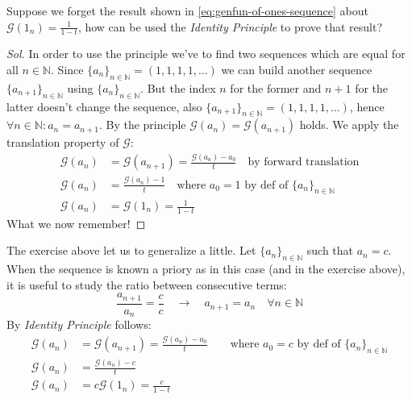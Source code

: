 \begin{exercise}
  Suppose we forget the result shown in
  \autoref{eq:genfun-of-ones-sequence} about $\mathcal{G} (1_n) =
  \frac{1}{1-t} $, how can be used the \emph{Identity Principle} to
  prove that result?
\end{exercise}
\begin{proof}[Sol]
  In order to use the principle we've to find two sequences which are
  equal for all $n \in \mathbb{N} $. Since $\{a_n\}_{n\in\mathbb{N} }
  = (1,1,1,1,\ldots)$ we can build another sequence
  $\{a_{n+1}\}_{n\in\mathbb{N} } $ using $\{a_n\}_{n\in\mathbb{N} }
  $. But the index $n$ for the former and $n+1$ for the latter doesn't
  change the sequence, also $\{a_{n+1}\}_{n\in\mathbb{N} } =
  (1,1,1,1,\ldots)$, hence $\forall n\in \mathbb{N}: a_n =
  a_{n+1}$. By the principle $\mathcal{G} (a_n) = \mathcal{G}
  (a_{n+1})$ holds. We apply the translation property of $\mathcal{G}
  $:
  \begin{displaymath}
    \begin{split}
      \mathcal{G} (a_n) &= \mathcal{G} (a_{n+1}) = \frac{\mathcal{G}
        (a_n) - a_0}{t} \quad \text{by forward translation} \\
      \mathcal{G} (a_n) &= \frac{\mathcal{G}
        (a_n) -1}{t} \quad \text{where } a_0 = 1 \text{ by def of }
      \{a_n\}_{n\in\mathbb{N} }\\
      \mathcal{G} (a_n) &= \mathcal{G} (1_n) = \frac{1}{1-t}
    \end{split}
  \end{displaymath}
  What we now remember!
\end{proof}

The exercise above let us to generalize a little. Let
$\{a_n\}_{n\in\mathbb{N} } $ such that $a_n = c$. When the sequence is
known a priory as in this case (and in the exercise above), it is
useful to study the ratio between consecutive terms:
\begin{displaymath}
   \frac{a_{n+1}}{a_n} =  \frac{c}{c} \quad \rightarrow \quad a_{n+1}
   = a_n \quad \forall n \in \mathbb{N}
\end{displaymath}
By \emph{Identity Principle} follows:
\begin{displaymath}
  \begin{split}
    \mathcal{G} (a_n) &= \mathcal{G} (a_{n+1}) = \frac{\mathcal{G}
      (a_n) - a_0}{t} \quad \quad \text{where } a_0 = c \text{ by def
      of }
    \{a_n\}_{n\in\mathbb{N} } \\
    \mathcal{G} (a_n) &= \frac{\mathcal{G}
      (a_n) -c}{t} \\
    \mathcal{G} (a_n) &= c\mathcal{G} (1_n) = \frac{c}{1-t}
  \end{split}
\end{displaymath}

